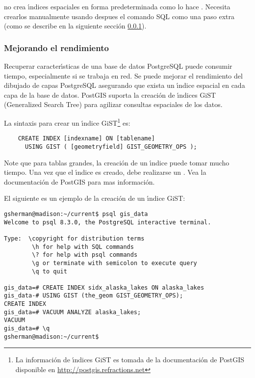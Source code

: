  no crea \'{\i}ndices espaciales en forma predeterminada como lo hace . Necesita crearlos manualmente usando despues el comando SQL  como una paso extra (como se describe en la siguiente secci\'on \ref{label_improve}).

\subsubsection{Mejorando el rendimiento} \label{label_improve}

Recuperar caracter\'{\i}sticas de una base de datos PostgreSQL puede consumir tiempo, especialmente si se trabaja en red. Se puede mejorar el rendimiento del dibujado de capas PostgreSQL asegurando que exista un \'{\i}ndice espacial  en cada capa de la base de datos. PostGIS suporta la creaci\'on de \'{\i}ndices GiST (Generalized Search Tree)  para agilizar consultas espaciales de los datos.

La sintaxis para crear un \'{\i}ndice GiST\footnote{La informaci\'on de \'{\i}ndices GiST es tomada de la documentaci\'on de PostGIS
disponible en \url{http://postgis.refractions.net}}
es:

\begin{verbatim}
    CREATE INDEX [indexname] ON [tablename] 
      USING GIST ( [geometryfield] GIST_GEOMETRY_OPS );
\end{verbatim}

Note que para tablas grandes, la creaci\'on de un \'{\i}ndice puede tomar mucho tiempo. Una vez
que el \'{\i}ndice es creado, debe realizarse un . Vea la documentaci\'on de
PostGIS \cite{PostGISweb} para mas informaci\'on.

El siguiente es un ejemplo de la creaci\'on de un \'{\i}ndice GiST:
\begin{verbatim}
gsherman@madison:~/current$ psql gis_data
Welcome to psql 8.3.0, the PostgreSQL interactive terminal.

Type:  \copyright for distribution terms
        \h for help with SQL commands
        \? for help with psql commands
        \g or terminate with semicolon to execute query
        \q to quit

gis_data=# CREATE INDEX sidx_alaska_lakes ON alaska_lakes
gis_data-# USING GIST (the_geom GIST_GEOMETRY_OPS);
CREATE INDEX
gis_data=# VACUUM ANALYZE alaska_lakes;
VACUUM
gis_data=# \q
gsherman@madison:~/current$
\end{verbatim}

